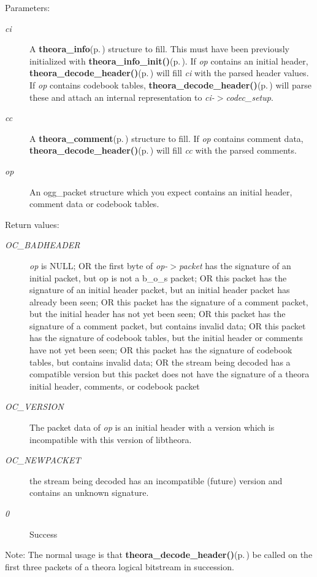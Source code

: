 \begin{Desc}
\item[Parameters:]
\begin{description}
\item[{\em ci}]A {\bf theora\_\-info}{\rm (p.\,\pageref{structtheora__info})} structure to fill. This must have been previously initialized with {\bf theora\_\-info\_\-init()}{\rm (p.\,\pageref{theora_8h_a29})}. If {\em op\/} contains an initial header, {\bf theora\_\-decode\_\-header()}{\rm (p.\,\pageref{theora_8h_a21})} will fill {\em ci\/} with the parsed header values. If {\em op\/} contains codebook tables, {\bf theora\_\-decode\_\-header()}{\rm (p.\,\pageref{theora_8h_a21})} will parse these and attach an internal representation to {\em ci-$>$codec\_\-setup\/}. \item[{\em cc}]A {\bf theora\_\-comment}{\rm (p.\,\pageref{structtheora__comment})} structure to fill. If {\em op\/} contains comment data, {\bf theora\_\-decode\_\-header()}{\rm (p.\,\pageref{theora_8h_a21})} will fill {\em cc\/} with the parsed comments. \item[{\em op}]An ogg\_\-packet structure which you expect contains an initial header, comment data or codebook tables.\end{description}
\end{Desc}
\begin{Desc}
\item[Return values:]
\begin{description}
\item[{\em OC\_\-BADHEADER}]{\em op\/} is NULL; OR the first byte of {\em op-$>$packet\/} has the signature of an initial packet, but op is not a b\_\-o\_\-s packet; OR this packet has the signature of an initial header packet, but an initial header packet has already been seen; OR this packet has the signature of a comment packet, but the initial header has not yet been seen; OR this packet has the signature of a comment packet, but contains invalid data; OR this packet has the signature of codebook tables, but the initial header or comments have not yet been seen; OR this packet has the signature of codebook tables, but contains invalid data; OR the stream being decoded has a compatible version but this packet does not have the signature of a theora initial header, comments, or codebook packet \item[{\em OC\_\-VERSION}]The packet data of {\em op\/} is an initial header with a version which is incompatible with this version of libtheora. \item[{\em OC\_\-NEWPACKET}]the stream being decoded has an incompatible (future) version and contains an unknown signature. \item[{\em 0}]Success\end{description}
\end{Desc}
\begin{Desc}
\item[Note:]The normal usage is that {\bf theora\_\-decode\_\-header()}{\rm (p.\,\pageref{theora_8h_a21})} be called on the first three packets of a theora logical bitstream in succession. \end{Desc}
